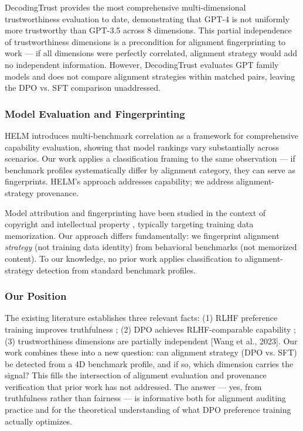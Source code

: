 DecodingTrust \citep{Wang2023DecodingTrust} provides the most comprehensive multi-dimensional
trustworthiness evaluation to date, demonstrating that GPT-4 is not uniformly more
trustworthy than GPT-3.5 across 8 dimensions. This partial independence of trustworthiness
dimensions is a precondition for alignment fingerprinting to work --- if all dimensions were
perfectly correlated, alignment strategy would add no independent information. However,
DecodingTrust evaluates GPT family models and does not compare alignment strategies within
matched pairs, leaving the DPO vs. SFT comparison unaddressed.

\subsubsection{Model Evaluation and Fingerprinting}

HELM \citep{Liang2022Holistic} introduces multi-benchmark correlation as a framework for
comprehensive capability evaluation, showing that model rankings vary substantially across
scenarios. Our work applies a classification framing to the same observation --- if benchmark
profiles systematically differ by alignment category, they can serve as fingerprints.
HELM's approach addresses capability; we address alignment-strategy provenance.

Model attribution and fingerprinting have been studied in the context of copyright and
intellectual property \citep{Zhao2023Protecting}, typically targeting training data memorization.
Our approach differs fundamentally: we fingerprint alignment \textit{strategy} (not training data
identity) from behavioral benchmarks (not memorized content). To our knowledge, no prior
work applies classification to alignment-strategy detection from standard benchmark profiles.

\subsubsection{Our Position}

The existing literature establishes three relevant facts: (1) RLHF preference training
improves truthfulness \citep{Ouyang2022Training}; (2) DPO achieves RLHF-comparable capability
\citep{Rafailov2023Direct}; (3) trustworthiness dimensions are partially independent [Wang et al.,
2023]. Our work combines these into a new question: can alignment strategy (DPO vs. SFT)
be detected from a 4D benchmark profile, and if so, which dimension carries the signal?
This fills the intersection of alignment evaluation and provenance verification that prior
work has not addressed. The answer --- yes, from truthfulness rather than fairness --- is
informative both for alignment auditing practice and for the theoretical understanding of
what DPO preference training actually optimizes.

